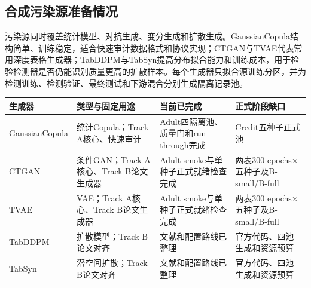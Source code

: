 \documentclass[
  chinese,
  12pt,
  a4paper,
  chinese,
  UTF8]{ctexart}
\begin{document}
\subsection{合成污染源准备情况}\label{ux5408ux6210ux6c61ux67d3ux6e90ux51c6ux5907ux60c5ux51b5}

污染源同时覆盖统计模型、对抗生成、变分生成和扩散生成。GaussianCopula结构简单、训练稳定，适合快速审计数据格式和协议实现；CTGAN与TVAE代表常用深度表格生成器；TabDDPM与TabSyn提高分布拟合能力和训练成本，用于检验检测器是否仍能识别质量更高的扩散样本。每个生成器只拟合源训练分区，并为检测训练、检测验证、最终测试和下游混合分别生成隔离记录池。

\begin{longtable}[]{@{}
  >{\raggedright\arraybackslash}p{}
  >{\raggedright\arraybackslash}p{}
  >{\raggedright\arraybackslash}p{}
  >{\raggedright\arraybackslash}p{}@{}}
\toprule\noalign{}
\begin{minipage}[b]{\linewidth}\raggedright
生成器
\end{minipage} & \begin{minipage}[b]{\linewidth}\raggedright
类型与固定用途
\end{minipage} & \begin{minipage}[b]{\linewidth}\raggedright
当前已完成
\end{minipage} & \begin{minipage}[b]{\linewidth}\raggedright
正式阶段缺口
\end{minipage} \\
\midrule\noalign{}
\endhead
\bottomrule\noalign{}
\endlastfoot
GaussianCopula & 统计Copula；Track A核心、快速审计 &
Adult四隔离池、质量门和run-through完成 & Credit五种子正式池 \\
CTGAN & 条件GAN；Track A核心、Track B论文生成器 & Adult
smoke与单种子正式就绪检查完成 & 两表300 epochs×五种子及B-small/B-full \\
TVAE & VAE；Track A核心、Track B论文生成器 & Adult
smoke与单种子正式就绪检查完成 & 两表300 epochs×五种子及B-small/B-full \\
TabDDPM & 扩散模型；Track B论文对齐 & 文献和配置路线已整理 &
官方代码、四池生成和资源预算 \\
TabSyn & 潜空间扩散；Track B论文对齐 & 文献和配置路线已整理 &
官方代码、四池生成和资源预算 \\
\end{longtable}
\end{document}
